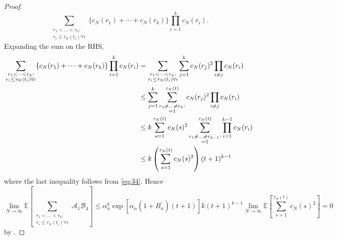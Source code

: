 \documentclass{article}
\newcommand{\E}{\mathbb{E}}
\newcommand{\1}[1]{\mathbbm{1}_{#1}}
\begin{document}
\begin{proof}
\begin{equation}
\sum_{\substack{r_1 <\dots< r_k :\\ r_i \leq \tau_N(t_i) \forall i}}
\{ c_N(r_1) + \cdots + c_N(r_k) \}
\prod_{i=1}^k  c_N(r_i) .
\end{equation}
Expanding the sum on the RHS,
\begin{align}
\sum_{\substack{r_1 <\dots< r_k :\\ r_i \leq \tau_N(t_i) \forall i}}
\{ c_N(r_1) + \cdots + c_N(r_k) \}
\prod_{i=1}^k  c_N(r_i)
&= \sum_{\substack{r_1 <\dots< r_k :\\ r_i \leq \tau_N(t_i) \forall i}}
\sum_{j=1}^k c_N(r_j)^2 \prod_{i\neq j} c_N(r_i) \notag\\
&\leq \sum_{j=1}^k \sum_{\substack{r_1 \neq \dots \neq r_k :\\ =1}}^{\tau_N(t)} c_N(r_j)^2 \prod_{i\neq j} c_N(r_i) \notag\\
&\leq k \sum_{s=1}^{\tau_N(t)} c_N(s)^2
\sum_{\substack{r_1 \neq \dots \neq r_{k-1} :\\ =1}}^{\tau_N(t)} \prod_{i=1}^{k-1} c_N(r_i) \notag\\
&\leq k \left( \sum_{s=1}^{\tau_N(t)} c_N(s)^2 \right) (t+1)^{k-1}
\end{align}
where the last inequality follows from \eqref{eq:34}.
Hence
\begin{equation}
\lim_{N\to\infty}\E\left[ \sum_{\substack{r_1 <\dots< r_k :\\ r_i \leq \tau_N(t_i) \forall i}} \mathscr{A}_1 \mathscr{B}_4 \right]
\leq \alpha_n^k \exp\left[\alpha_n (1 + B_n^\prime) (t+1) \right] 
k (t+1)^{k-1} \lim_{N\to\infty}\E\left[ \sum_{s=1}^{\tau_N(t)} c_N(s)^2 \right] =0
\end{equation}
by \citet[Equation (3.4)]{brown2021}.


\end{proof}
\end{document}
